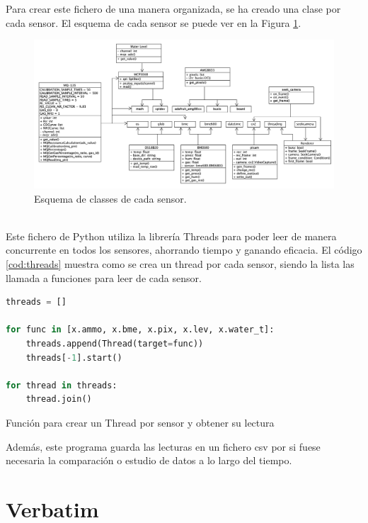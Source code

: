 Para crear este fichero de una manera organizada, se ha creado una clase por cada sensor. El esquema de cada sensor se puede ver en la Figura \ref{fig:umlet}. 
\begin{figure} [h!]
  \begin{center}
    \includegraphics[width=16cm]{figs/umlet}
  \end{center}
  \caption{Esquema de classes de cada sensor.}
  \label{fig:umlet}
\end{figure}\\

Este fichero de Python utiliza la librería Threads para poder leer de manera concurrente en todos los sensores, ahorrando tiempo y ganando eficacia. El código \ref{cod:threads} muestra como se crea un thread por cada sensor, siendo la lista las llamada a funciones para leer de cada sensor.
\begin{code}[h]
\begin{lstlisting}[language=Python]
threads = []

for func in [x.ammo, x.bme, x.pix, x.lev, x.water_t]:
	threads.append(Thread(target=func))
	threads[-1].start()
	
for thread in threads:
	thread.join()
\end{lstlisting}
\caption[Función para crear un Thread por sensor y obtener su lectura]{Función para crear un Thread por sensor y obtener su lectura}
\label{cod:threads}
\end{code}

Además, este programa guarda las lecturas en un fichero csv por si fuese necesaria la comparación o estudio de datos a lo largo del tiempo.



\section{Verbatim}

